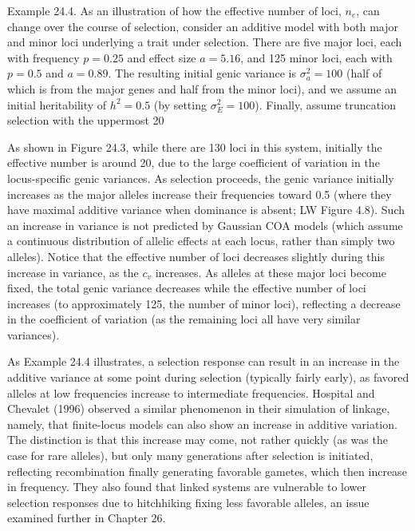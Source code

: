 \documentclass{article}
\begin{document}
Example 24.4. As an illustration of how the effective number of loci,  $ n_e $, can change over the course of selection, consider an additive model with both major and minor loci underlying a trait under selection. There are five major loci, each with frequency  $ p = 0.25 $ and effect size  $ a = 5.16 $, and 125 minor loci, each with  $ p = 0.5 $ and  $ a = 0.89 $. The resulting initial genic variance is  $ \sigma_a^2 = 100 $ (half of which is from the major genes and half from the minor loci), and we assume an initial heritability of  $ h^2 = 0.5 $ (by setting  $ \sigma_E^2 = 100 $). Finally, assume truncation selection with the uppermost 20%

As shown in Figure 24.3, while there are 130 loci in this system, initially the effective number is around 20, due to the large coefficient of variation in the locus-specific genic variances. As selection proceeds, the genic variance initially increases as the major alleles increase their frequencies toward 0.5 (where they have maximal additive variance when dominance is absent; LW Figure 4.8). Such an increase in variance is not predicted by Gaussian COA models (which assume a continuous distribution of allelic effects at each locus, rather than simply two alleles). Notice that the effective number of loci decreases slightly during this increase in variance, as the  $ c_{v} $ increases. As alleles at these major loci become fixed, the total genic variance decreases while the effective number of loci increases (to approximately 125, the number of minor loci), reflecting a decrease in the coefficient of variation (as the remaining loci all have very similar variances).

As Example 24.4 illustrates, a selection response can result in an increase in the additive variance at some point during selection (typically fairly early), as favored alleles at low frequencies increase to intermediate frequencies. Hospital and Chevalet (1996) observed a similar phenomenon in their simulation of linkage, namely, that finite-locus models can also show an increase in additive variation. The distinction is that this increase may come, not rather quickly (as was the case for rare alleles), but only many generations after selection is initiated, reflecting recombination finally generating favorable gametes, which then increase in frequency. They also found that linked systems are vulnerable to lower selection responses due to hitchhiking fixing less favorable alleles, an issue examined further in Chapter 26.
\end{document}
